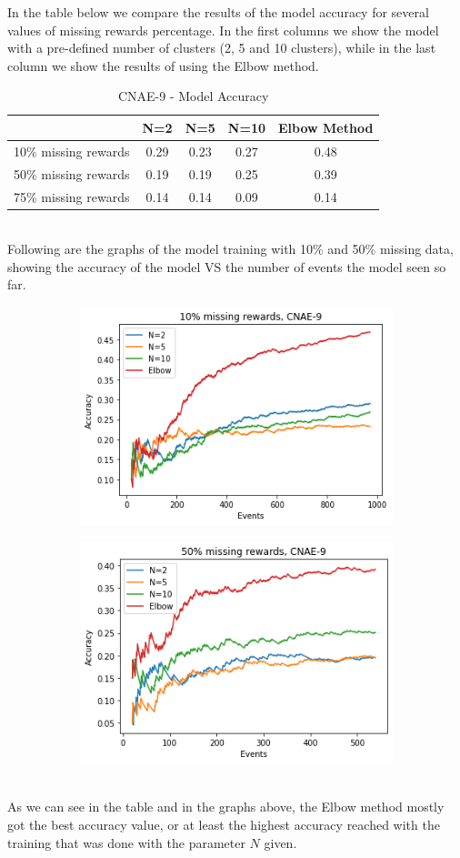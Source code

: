 \documentclass{article}
\begin{document}
In the table below we compare the results of the model accuracy for several values of missing rewards percentage. In the first columns we show the model with a pre-defined number of clusters (2, 5 and 10 clusters), while in the last column we show the results of using the Elbow method.\\

\begin{table}[h!]
\begin{center}
\begin{tabular}{ |c||c|c|c|c| } 
 \hline 
  & N=2 & N=5 & N=10 & Elbow Method\\ 
 \hline \hline
 10\% missing rewards & 0.29 & 0.23 & 0.27 & 0.48\\ 
 \hline
 50\% missing rewards & 0.19 & 0.19 & 0.25 & 0.39\\ 
 \hline
 75\% missing rewards & 0.14 & 0.14 & 0.09 & 0.14\\ 
 \hline
\end{tabular}
\caption{CNAE-9 - Model Accuracy}
\end{center}
\end{table}\\
Following are the graphs of the model training with 10\% and 50\% missing data, showing the accuracy of the model VS the number of events the model seen so far.\\
\begin{figure}[H]
\centering
\begin{subfigure}{\textwidth}
  \centering
  \includegraphics[width=.4\linewidth]{CNAE9, 10 missing}
  \label{fig:sub1}
\end{subfigure}%
\begin{subfigure}{\textwidth}
  \centering
  \includegraphics[width=.4\linewidth]{CNAE9, 50 missing2}
  \label{fig:sub2}
\end{subfigure}
\label{fig:test}
\end{figure}\\
As we can see in the table and in the graphs above, the Elbow method mostly got the best accuracy value, or at least the highest accuracy reached with the training that was done with the parameter $N$ given.\\
\end{document}
